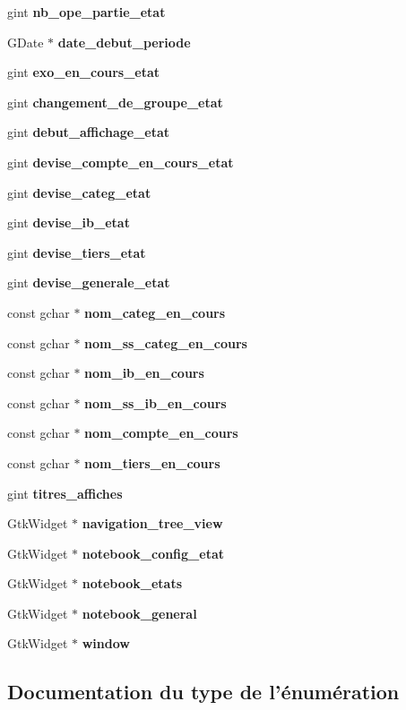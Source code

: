 \begin{DoxyCompactItemize}
\item 
gint {\bf nb\_\-ope\_\-partie\_\-etat}
\item 
GDate $\ast$ {\bf date\_\-debut\_\-periode}
\item 
gint {\bf exo\_\-en\_\-cours\_\-etat}
\item 
gint {\bf changement\_\-de\_\-groupe\_\-etat}
\item 
gint {\bf debut\_\-affichage\_\-etat}
\item 
gint {\bf devise\_\-compte\_\-en\_\-cours\_\-etat}
\item 
gint {\bf devise\_\-categ\_\-etat}
\item 
gint {\bf devise\_\-ib\_\-etat}
\item 
gint {\bf devise\_\-tiers\_\-etat}
\item 
gint {\bf devise\_\-generale\_\-etat}
\item 
const gchar $\ast$ {\bf nom\_\-categ\_\-en\_\-cours}
\item 
const gchar $\ast$ {\bf nom\_\-ss\_\-categ\_\-en\_\-cours}
\item 
const gchar $\ast$ {\bf nom\_\-ib\_\-en\_\-cours}
\item 
const gchar $\ast$ {\bf nom\_\-ss\_\-ib\_\-en\_\-cours}
\item 
const gchar $\ast$ {\bf nom\_\-compte\_\-en\_\-cours}
\item 
const gchar $\ast$ {\bf nom\_\-tiers\_\-en\_\-cours}
\item 
gint {\bf titres\_\-affiches}
\item 
GtkWidget $\ast$ {\bf navigation\_\-tree\_\-view}
\item 
GtkWidget $\ast$ {\bf notebook\_\-config\_\-etat}
\item 
GtkWidget $\ast$ {\bf notebook\_\-etats}
\item 
GtkWidget $\ast$ {\bf notebook\_\-general}
\item 
GtkWidget $\ast$ {\bf window}
\end{DoxyCompactItemize}


\subsection{Documentation du type de l'énumération}
